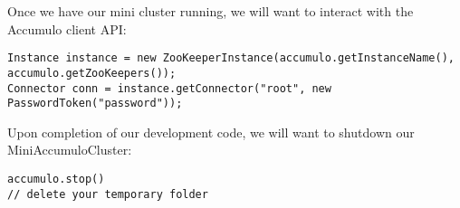 Once we have our mini cluster running, we will want to interact with the Accumulo client API:

\begingroup\fontsize{8pt}{8pt}\selectfont\begin{verbatim}
Instance instance = new ZooKeeperInstance(accumulo.getInstanceName(), accumulo.getZooKeepers());
Connector conn = instance.getConnector("root", new PasswordToken("password"));
\end{verbatim}\endgroup

Upon completion of our development code, we will want to shutdown our MiniAccumuloCluster:

\begingroup\fontsize{8pt}{8pt}\selectfont\begin{verbatim}
accumulo.stop()
// delete your temporary folder
\end{verbatim}\endgroup
